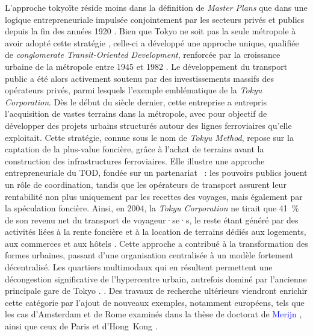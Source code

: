 \begin{refsegment}
{    L'approche tokyoïte réside moins dans la définition de \textsl{Master Plans} que dans une logique entrepreneuriale impulsée conjointement par les secteurs privés et publics depuis la fin des années 1920 \textcolor{blue}{\autocite[p.~181-209 (chapitre 7)]{cervero_transit_1998}}. Bien que Tokyo ne soit pas la seule métropole à avoir adopté cette stratégie \textcolor{blue}{\autocite[87]{bertolini_developing_2016}}, celle-ci a développé une approche unique, qualifiée de \textsl{conglomerate Transit-Oriented Development}, renforcée par la croissance urbaine de la métropole entre 1945 et 1982 \textcolor{blue}{\autocite[28-29]{liu_historical_2024}}. Le développement du transport public a été alors activement soutenu par des investissements massifs des opérateurs privés, parmi lesquels l'exemple emblématique de la \textsl{Tokyu Corporation}. Dès le début du siècle dernier, cette entreprise a entrepris l'acquisition de vastes terrains dans la métropole, avec pour objectif de développer des projets urbains structurés autour des lignes ferroviaires qu'elle exploitait. Cette stratégie, connue sous le nom de \textsl{Tokyu Method}, repose sur la captation de la plus-value foncière, grâce à l’achat de terrains avant la construction des infrastructures ferroviaires. Elle illustre une approche entrepreneuriale du \acrshort{TOD}, fondée sur un partenariat ~: les pouvoirs publics jouent un rôle de coordination, tandis que les opérateurs de transport assurent leur rentabilité non plus uniquement par les recettes des voyages, mais également par la spéculation foncière. Ainsi, en 2004, la \textsl{Tokyu Corporation} ne tirait que 41~\% de son revenu net du transport de voyageur·se·s, le reste étant généré par des activités liées à la rente foncière et à la location de terrains dédiés aux logements, aux commerces et aux hôtels \textcolor{blue}{\autocite[110]{suzuki_financing_2015}}. Cette approche a contribué à la transformation des formes urbaines, passant d’une organisation centralisée à un modèle fortement décentralisé. Les quartiers multimodaux qui en résultent permettent une décongestion significative de l’hypercentre urbain, autrefois dominé par l’ancienne principale gare de Tokyo \textcolor{blue}{\autocite[29]{liu_historical_2024}}.
} \textcolor{blue}{\autocite[109-209]{cervero_transit_1998}}. Des travaux de recherche ultérieurs viendront enrichir cette catégorie par l’ajout de nouveaux exemples, notamment européens, tels que les cas d’Amsterdam et de Rome examinés dans la thèse de doctorat de \textcolor{blue}{Merijn} \textcolor{blue}{\textcite[180-206]{martens_adaptive_2006}}, ainsi que ceux de Paris et d'Hong~Kong \textcolor{blue}{\autocite[4]{knowles_transports_2020}}.%


\end{refsegment}
